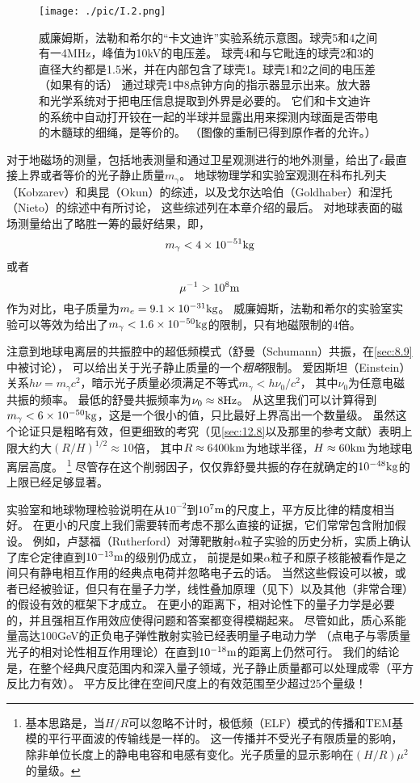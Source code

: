\documentclass[12pt]{book}
\numberwithin{equation}{chapter}
\numberwithin{figure}{chapter}
\numberwithin{footnote}{page}
\begin{document}
\begin{figure}[!ht]
    \centering
    \texttt{[image: ./pic/I.2.png]}
    \captionsetup{justification=raggedright, singlelinecheck=false}
    \caption{威廉姆斯，法勒和希尔的“卡文迪许”实验系统示意图。球壳5和4之间有一4MHz，峰值为10kV的电压差。
        球壳4和与它毗连的球壳2和3的直径大约都是1.5米，并在内部包含了球壳1。球壳1和2之间的电压差（如果有的话）
        通过球壳1中8点钟方向的指示器显示出来。放大器和光学系统对于把电压信息提取到外界是必要的。
        它们和卡文迪许的系统中自动打开铰在一起的半球并显露出用来探测内球面是否带电的木髓球的细绳，是等价的。
        （图像的重制已得到原作者的允许。）}
    \label{fig:I.2}
\end{figure}

对于地磁场的测量，包括地表测量和通过卫星观测进行的地外测量，给出了$\epsilon$最直接上界或者等价的光子静止质量$m_{\gamma}$。
地球物理学和实验室观测在科布扎列夫（Kobzarev）和奥昆（Okun）的综述，以及戈尔达哈伯（Goldhaber）和涅托（Nieto）的综述中有所讨论，
这些综述列在本章介绍的最后。
对地球表面的磁场测量给出了略胜一筹的最好结果，即，
$$m_{\gamma}<4\times 10^{-51} {\rm kg}$$
或者
$$\mu^{-1}>10^8{\rm m}$$
作为对比，电子质量为$m_e=9.1\times 10^{-31}{\rm kg}$。
威廉姆斯，法勒和希尔的实验室实验可以等效为给出了$m_{\gamma}<1.6\times 10^{-50}{\rm kg}$的限制，只有地磁限制的4倍。

注意到地球电离层的共振腔中的超低频模式（舒曼（Schumann）共振，在\autoref{sec:8.9}中被讨论），
可以给出关于光子静止质量的一个\textit{粗略}限制。
爱因斯坦（Einstein）关系$h\nu=m_{\gamma}c^2$，暗示光子质量必须满足不等式$m_{\gamma}<h\nu_0/c^2$，
其中$\nu_0$为任意电磁共振的频率。
最低的舒曼共振频率为$\nu_0\approx 8{\rm Hz}$。
从这里我们可以计算得到$m_{\gamma}<6\times 10^{-50}{\rm kg}$，这是一个很小的值，只比最好上界高出一个数量级。
虽然这个论证只是粗略有效，但更细致的考究（见\autoref{sec:12.8}以及那里的参考文献）表明上限大约大$(R/H)^{1/2}\approx 10$倍，
其中$R\approx 6400{\rm km}$为地球半径，$H\approx 60{\rm km}$为地球电离层高度。
\footnote{基本思路是，当$H/R$可以忽略不计时，极低频（ELF）模式的传播和TEM基模的平行平面波的传输线是一样的。
    这一传播并不受光子有限质量的影响，除非单位长度上的静电电容和电感有变化。光子质量的显示影响在$(H/R)\mu^2$的量级。}
尽管存在这个削弱因子，仅仅靠舒曼共振的存在就确定的$10^{-48}{\rm kg}$的上限已经足够显著。

实验室和地球物理检验说明在从$10^{-2}$到$10^{7}{\rm m}$的尺度上，平方反比律的精度相当好。
在更小的尺度上我们需要转而考虑不那么直接的证据，它们常常包含附加假设。
例如，卢瑟福（Rutherford）对薄靶散射$\alpha$粒子实验的历史分析，实质上确认了库仑定律直到$10^{-13}{\rm m}$的级别仍成立，
前提是如果$\alpha$粒子和原子核能被看作是之间只有静电相互作用的经典点电荷并忽略电子云的话。
当然这些假设可以被，或者已经被验证，但只有在量子力学，线性叠加原理（见下）以及其他（非常合理）的假设有效的框架下才成立。
在更小的距离下，相对论性下的量子力学是必要的，并且强相互作用效应使得问题和答案都变得模糊起来。
尽管如此，质心系能量高达100GeV的正负电子弹性散射实验已经表明量子电动力学
（点电子与零质量光子的相对论性相互作用理论）在直到$10^{-18}{\rm m}$的距离上仍然可行。
我们的结论是，在整个经典尺度范围内和深入量子领域，光子静止质量都可以处理成零（平方反比力有效）。
平方反比律在空间尺度上的有效范围至少超过25个量级！
\end{document}
